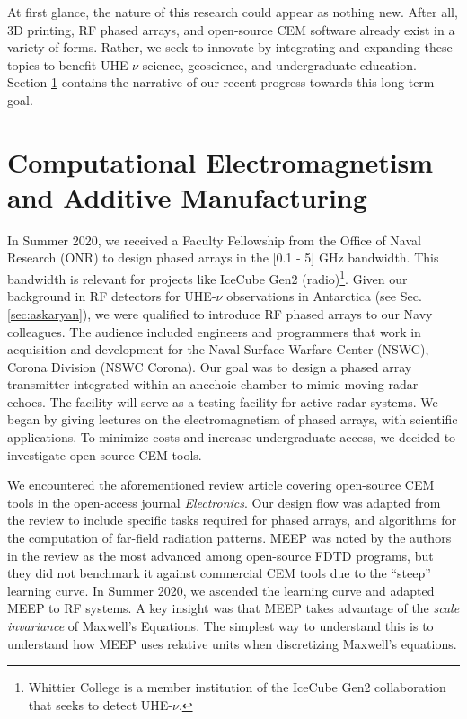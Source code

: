 \documentclass[10pt]{amsart}
\theoremstyle{definition}
\numberwithin{equation}{section}
\begin{document}
At first glance, the nature of this research could appear as nothing new.  After all, 3D printing, RF phased arrays, and open-source CEM software already exist in a variety of forms.  Rather, we seek to innovate by integrating and expanding these topics to benefit UHE-$\nu$ science, geoscience, and undergraduate education.  Section \ref{sec:cem} contains the narrative of our recent progress towards this long-term goal.

\section{Computational Electromagnetism and Additive Manufacturing}
\label{sec:cem}

In Summer 2020, we received a Faculty Fellowship from the Office of Naval Research (ONR) to design phased arrays in the [0.1 - 5] GHz bandwidth.  This bandwidth is relevant for projects like IceCube Gen2 (radio)\footnote{Whittier College is a member institution of the IceCube Gen2 collaboration that seeks to detect UHE-$\nu$.}.  Given our background in RF detectors for UHE-$\nu$ observations in Antarctica (see Sec. \ref{sec:askaryan}), we were qualified to introduce RF phased arrays to our Navy colleagues.  The audience included engineers and programmers that work in acquisition and development for the Naval Surface Warfare Center (NSWC), Corona Division (NSWC Corona).  Our goal was to design a phased array transmitter integrated within an anechoic chamber to mimic moving radar echoes.  The facility will serve as a testing facility for active radar systems.  We began by giving lectures on the electromagnetism of phased arrays, with scientific applications.  To minimize costs and increase undergraduate access, we decided to investigate open-source CEM tools. 


We encountered the aforementioned review article covering open-source CEM tools in the open-access journal \textit{Electronics}.  Our design flow was adapted from the review to include specific tasks required for phased arrays, and algorithms for the computation of far-field radiation patterns.  MEEP was noted by the authors in the review as the most advanced among open-source FDTD programs, but they did not benchmark it against commercial CEM tools due to the ``steep'' learning curve.  In Summer 2020, we ascended the learning curve and adapted MEEP to RF systems.  A key insight was that MEEP takes advantage of the \textit{scale invariance} of Maxwell's Equations.  The simplest way to understand this is to understand how MEEP uses relative units when discretizing Maxwell's equations. 
\end{document}
